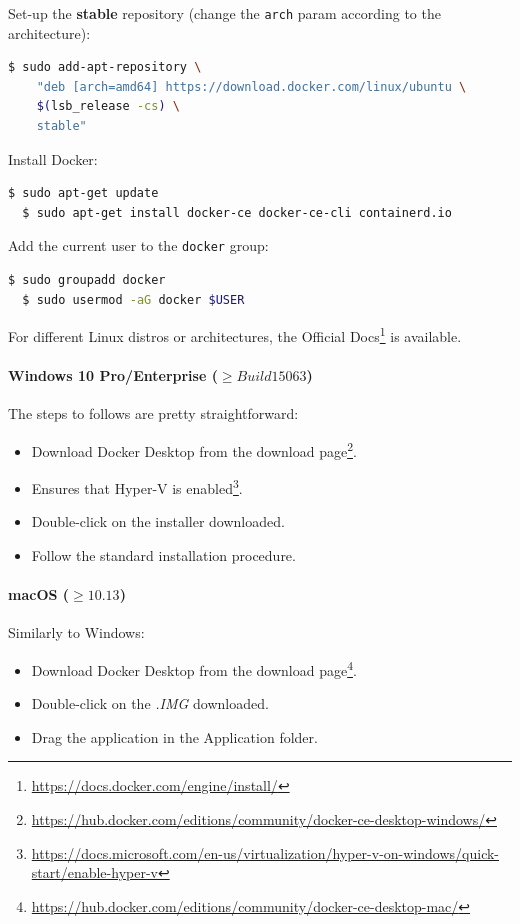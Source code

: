 \noindent Set-up the \textbf{stable} repository (change the \texttt{arch} param according to the architecture):
\begin{lstlisting}[language=bash, showstringspaces=false, basicstyle=\ttfamily]
  $ sudo add-apt-repository \
    "deb [arch=amd64] https://download.docker.com/linux/ubuntu \
    $(lsb_release -cs) \
    stable"
\end{lstlisting}

\noindent Install Docker:
\begin{lstlisting}[language=bash]
  $ sudo apt-get update
  $ sudo apt-get install docker-ce docker-ce-cli containerd.io
\end{lstlisting}

\noindent Add the current user to the \texttt{docker} group:
\begin{lstlisting}[language=bash]
  $ sudo groupadd docker
  $ sudo usermod -aG docker $USER
\end{lstlisting}

\noindent For different Linux distros or architectures, the Official Docs\footnote{\url{https://docs.docker.com/engine/install/}} is available.

\paragraph{Windows 10 Pro/Enterprise ($\geq Build 15063$)} The steps to follows are pretty straightforward:

\begin{itemize}
    \item[1.] Download Docker Desktop from the download page\footnote{\url{https://hub.docker.com/editions/community/docker-ce-desktop-windows/}}.
    \item[2.] Ensures that Hyper-V is enabled\footnote{\url{https://docs.microsoft.com/en-us/virtualization/hyper-v-on-windows/quick-start/enable-hyper-v}}.
    \item[3.] Double-click on the installer downloaded.
    \item[4.] Follow the standard installation procedure.
\end{itemize}

\paragraph{macOS ($\geq 10.13$)} Similarly to Windows:

\begin{itemize}
    \item[1.] Download Docker Desktop from the download page\footnote{\url{https://hub.docker.com/editions/community/docker-ce-desktop-mac/}}.
    \item[2.] Double-click on the \textit{.IMG} downloaded.
    \item[3.] Drag the application in the Application folder.
\end{itemize}

